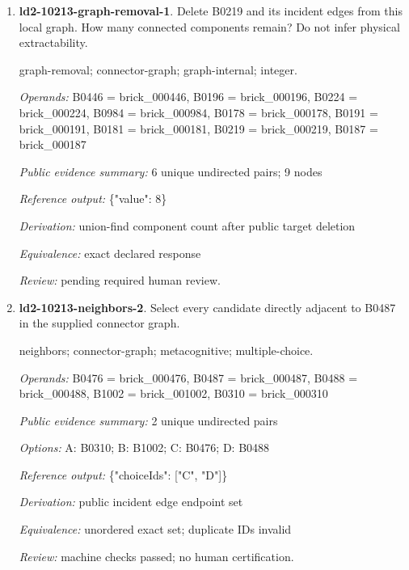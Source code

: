 \begin{enumerate}
\par{\small neighbors; connector-graph; metacognitive; multiple-choice.\par\textit{Operands:} B0446 = brick\_000446, B0178 = brick\_000178, B0191 = brick\_000191, B0984 = brick\_000984, B0219 = brick\_000219, B0196 = brick\_000196, B0224 = brick\_000224, B0181 = brick\_000181, B0187 = brick\_000187\par\textit{Public evidence summary:} 6 unique undirected pairs\par\textit{Options:} A: B0191; B: B0181; C: B0984; D: B0196; E: B0187; F: B0446; G: B0224; H: B0178\par\textit{Reference output:} \{"choiceIds": ["A", "B", "D", "E", "G", "H"]\}\par\textit{Derivation:} public incident edge endpoint set\par\textit{Equivalence:} unordered exact set; duplicate IDs invalid\par\textit{Review:} pending required human review.}
\item \textbf{ld2-10213-graph-removal-1}. Delete B0219 and its incident edges from this local graph. How many connected components remain? Do not infer physical extractability.
\par{\small graph-removal; connector-graph; graph-internal; integer.\par\textit{Operands:} B0446 = brick\_000446, B0196 = brick\_000196, B0224 = brick\_000224, B0984 = brick\_000984, B0178 = brick\_000178, B0191 = brick\_000191, B0181 = brick\_000181, B0219 = brick\_000219, B0187 = brick\_000187\par\textit{Public evidence summary:} 6 unique undirected pairs; 9 nodes\par\textit{Reference output:} \{"value": 8\}\par\textit{Derivation:} union-find component count after public target deletion\par\textit{Equivalence:} exact declared response\par\textit{Review:} pending required human review.}
\item \textbf{ld2-10213-neighbors-2}. Select every candidate directly adjacent to B0487 in the supplied connector graph.
\par{\small neighbors; connector-graph; metacognitive; multiple-choice.\par\textit{Operands:} B0476 = brick\_000476, B0487 = brick\_000487, B0488 = brick\_000488, B1002 = brick\_001002, B0310 = brick\_000310\par\textit{Public evidence summary:} 2 unique undirected pairs\par\textit{Options:} A: B0310; B: B1002; C: B0476; D: B0488\par\textit{Reference output:} \{"choiceIds": ["C", "D"]\}\par\textit{Derivation:} public incident edge endpoint set\par\textit{Equivalence:} unordered exact set; duplicate IDs invalid\par\textit{Review:} machine checks passed; no human certification.}

\end{enumerate}
